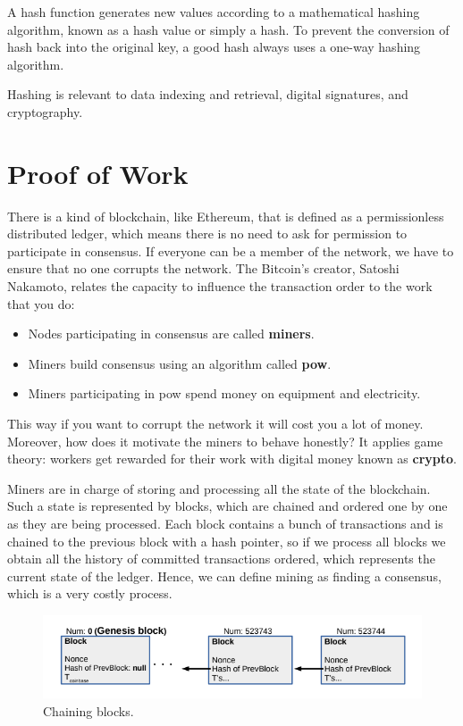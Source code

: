 \documentclass[a4paper,12pt]{article}
\begin{document}
\begin{appendices}
{A hash function generates new values according to a mathematical hashing algorithm, known as a hash value or simply a hash. To prevent the conversion of hash back into the original key, a good hash always uses a one-way hashing algorithm.

Hashing is relevant to data indexing and retrieval, digital signatures, and cryptography. }

\section{Proof of Work}
\label{appendix:proof-of-work}
{
There is a kind of blockchain, like Ethereum, that is defined as a permissionless distributed ledger, which means there is no need to ask for permission to participate in consensus. If everyone can be a member of the network, we have to ensure that no one corrupts the network. The Bitcoin's creator, {Satoshi Nakamoto}\cite{sathoshi}, relates the capacity to influence the transaction order to the work that you do:
\begin{itemize}
    \item Nodes participating in consensus are called \textbf{miners}.
    \item Miners build consensus using an algorithm called \textbf{\acrlong{pow}}.
    \item Miners participating in \acrshort{pow} spend money on equipment and electricity.
\end{itemize}
This way if you want to corrupt the network it will cost you a lot of money. Moreover, how does it motivate the miners to behave honestly? It applies game theory: workers get rewarded for their work with digital money known as \textbf{crypto}.

Miners are in charge of storing and processing all the state of the blockchain. Such a state is represented by blocks, which are chained and ordered one by one as they are being processed. Each block contains a bunch of transactions and is chained to the previous block with a hash pointer, so if we process all blocks we obtain all the history of committed transactions ordered, which represents the current state of the ledger. Hence, we can define mining as finding a consensus, which is a very costly process.

\begin{figure}[H]
\centering
\includegraphics[width=14cm]{img/chapter_2/blocks.png}
\caption[Chaining blocks]{\footnotesize{Chaining blocks.}}
\label{fig:chaining_blocks}
\end{figure}

}
\end{appendices}
\end{document}
